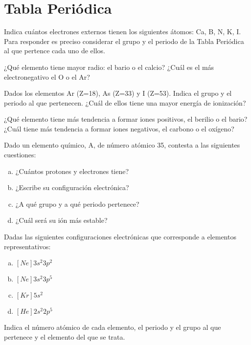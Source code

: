 \section{Tabla Periódica}

\begin{prob}
Indica cuántos electrones externos tienen los siguientes átomos: Ca, B, N, K, I.
Para responder es preciso considerar el grupo y el periodo de la Tabla Periódica al que pertence
cada uno de ellos. 
\end{prob}


\begin{prob}
¿Qué elemento tiene mayor radio: el bario o el calcio? ¿Cuál es el más electronegativo 
el O o el Ar?
\end{prob}


\begin{prob}
Dados los elementos Ar (Z=18), As (Z=33) y I (Z=53). Indica el grupo y el periodo al que pertenecen.
¿Cuál de ellos tiene una mayor energía de ionización? 
\end{prob}


\begin{prob}
¿Qué elemento tiene más tendencia a formar iones positivos, el berilio o el bario?
¿Cuál tiene más tendencia a formar iones negativos, el carbono o el oxígeno?
\end{prob}

\begin{prob}
Dado un elemento químico, A, de número atómico 35, contesta a las siguientes cuestiones:
\begin{enumerate}[a)]
\item ¿Cuántos protones y electrones tiene?
\item ¿Escribe su configuración electrónica?
\item ¿A qué grupo y a qué periodo pertenece?
\item ¿Cuál será su ión más estable?
\end{enumerate}
\end{prob}

\begin{prob}
Dadas las siguientes configuraciones electrónicas que corresponde a elementos
representativos:
\begin{multicols}{2}
\begin{enumerate}[a)]
\item $[Ne] 3s^2 3p^2$
\item $[Ne] 3s^2 3p^5$
\item $[Kr] 5s^2$
\item $[He] 2s^2 2p^5$
\end{enumerate}
\end{multicols}
Indica el número atómico de cada elemento, el periodo y el grupo al que pertenece y el
elemento del que se trata.
\end{prob}

